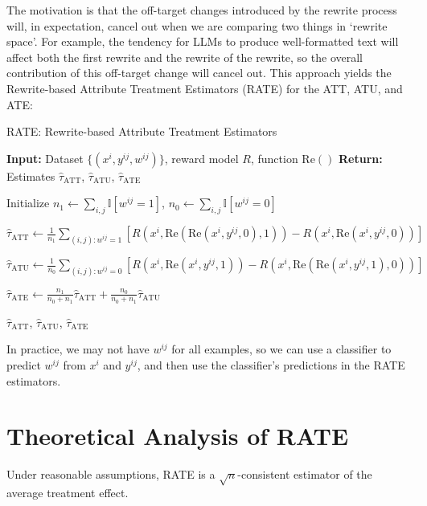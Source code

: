 \documentclass{article}
\theoremstyle{definition}
\begin{document}
The motivation is that the off-target changes introduced by the rewrite process will, in expectation, cancel out when we are comparing two things in `rewrite space'. For example, the tendency for LLMs to produce well-formatted text will affect both the first rewrite and the rewrite of the rewrite, so the overall contribution of this off-target change will cancel out. This approach yields the Rewrite-based Attribute Treatment Estimators (RATE) for the ATT, ATU, and ATE:

\begin{algorithm}[H]
  \caption{RATE: Rewrite-based Attribute Treatment Estimators}
  \label{alg:rate}
  \begin{algorithmic}[1]
  \State \textbf{Input:} Dataset $\{(x^i, y^{ij}, w^{ij})\}$, reward model $R$, function $\text{Re}()$
  \State \textbf{Return:} Estimates $\hat{\tau}_{\text{ATT}}$, $\hat{\tau}_{\text{ATU}}$, $\hat{\tau}_{\text{ATE}}$
  
  \State Initialize $n_1 \leftarrow \sum_{i,j} \mathbb{I}[w^{ij} = 1]$, $n_0 \leftarrow \sum_{i,j} \mathbb{I}[w^{ij} = 0]$
  
  \State $\hat{\tau}_{\text{ATT}} \leftarrow \frac{1}{n_1} \sum\limits_{(i,j): w^{ij} = 1} [R(x^i, \text{Re}(\text{Re}(x^i, y^{ij}, 0), 1)) - R(x^i, \text{Re}(x^i, y^{ij}, 0))]$
  
  \State $\hat{\tau}_{\text{ATU}} \leftarrow \frac{1}{n_0} \sum\limits_{(i,j): w^{ij} = 0} [R(x^i, \text{Re}(x^i, y^{ij}, 1)) - R(x^i, \text{Re}(\text{Re}(x^i, y^{ij}, 1), 0))]$
  
  \State $\hat{\tau}_{\text{ATE}} \leftarrow \frac{n_1}{n_0 + n_1} \hat{\tau}_{\text{ATT}} + \frac{n_0}{n_0 + n_1} \hat{\tau}_{\text{ATU}}$
  
  \State \Return $\hat{\tau}_{\text{ATT}}$, $\hat{\tau}_{\text{ATU}}$, $\hat{\tau}_{\text{ATE}}$
  \end{algorithmic}
\end{algorithm}
In practice, we may not have $w^{ij}$ for all examples, so we can use a classifier to predict $w^{ij}$ from $x^i$ and $y^{ij}$, and then use the classifier's predictions in the RATE estimators.
  
\section{Theoretical Analysis of RATE}
\label{sec:theory}

Under reasonable assumptions, RATE is a $\sqrt{n}$-consistent estimator of the average treatment effect.
\end{document}
